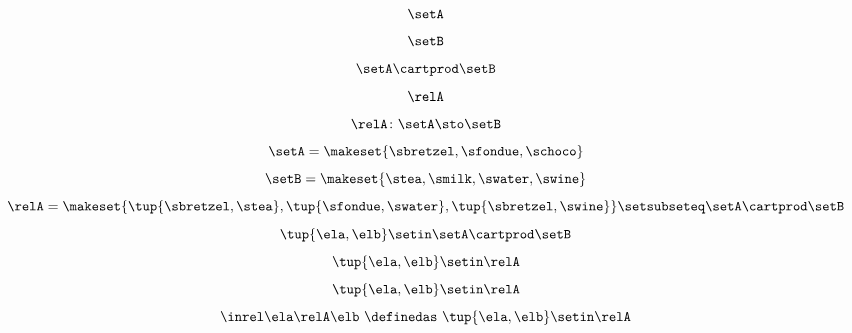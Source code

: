 {\begin{forslides}
        \begin{equation}
            \label{eq:slides_session2_rel_72}
            \setA
        \end{equation}
        \begin{equation}
            \label{eq:slides_session2_rel_73}
            \setB
        \end{equation}
        \begin{equation}
            \label{eq:slides_session2_rel_74}
            \setA \cartprod \setB
        \end{equation}
        \begin{equation}
            \label{eq:slides_session2_rel_75}
            \relA
        \end{equation}
        \begin{equation}
            \label{eq:slides_session2_rel_76}
            \relA \colon \setA \sto \setB
        \end{equation}
        \begin{equation}
            \label{eq:slides_session2_rel_77}
            \setA = \makeset{ \sbretzel, \sfondue, \schoco }
        \end{equation}
        \begin{equation}
            \label{eq:slides_session2_rel_78}
            \setB = \makeset{ \stea, \smilk, \swater, \swine }
        \end{equation}
        \begin{equation}
            \label{eq:slides_session2_rel_79}
            \relA = \makeset{ \tup{\sbretzel, \stea}, \tup{\sfondue, \swater}, \tup{\sbretzel, \swine} } \setsubseteq \setA \cartprod \setB
        \end{equation}
        \begin{equation}
            \label{eq:slides_session2_rel_80}
            \tup{\ela,\elb} \setin \setA \cartprod \setB
        \end{equation}
        \begin{equation}
            \label{eq:slides_session2_rel_81}
            \tup{\ela,\elb} \setin \relA
        \end{equation}
        \begin{equation}
            \label{eq:slides_session2_rel_82}
            \tup{\ela,\elb}\setin \relA
        \end{equation}
        \begin{equation}
            \label{eq:slides_session2_rel_83}
            \inrel \ela \relA \elb \ \definedas\  \tup{\ela,\elb}\setin \relA
        \end{equation}


\end{forslides}}
